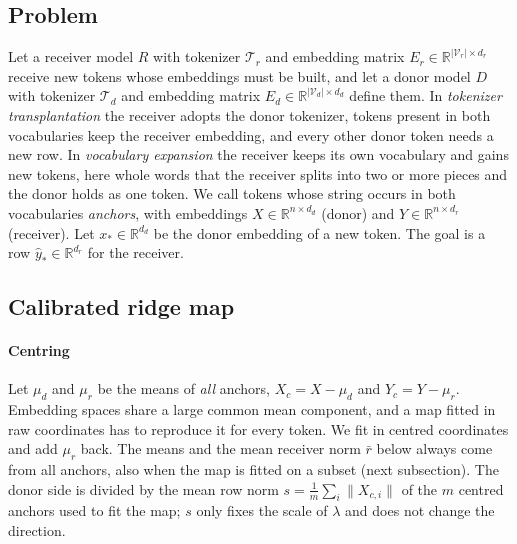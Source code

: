 \documentclass[preprint,12pt]{elsarticle}
\begin{document}
\subsection{Problem}
Let a receiver model $R$ with tokenizer $\mathcal T_r$ and embedding matrix $E_r\in\mathbb R^{|\mathcal V_r|\times d_r}$ receive new tokens whose embeddings must be built, and let a donor model $D$ with tokenizer $\mathcal T_d$ and embedding matrix $E_d\in\mathbb R^{|\mathcal V_d|\times d_d}$ define them. In \emph{tokenizer transplantation} the receiver adopts the donor tokenizer, tokens present in both vocabularies keep the receiver embedding, and every other donor token needs a new row. In \emph{vocabulary expansion} the receiver keeps its own vocabulary and gains new tokens, here whole words that the receiver splits into two or more pieces and the donor holds as one token. We call tokens whose string occurs in both vocabularies \emph{anchors}, with embeddings $X\in\mathbb R^{n\times d_d}$ (donor) and $Y\in\mathbb R^{n\times d_r}$ (receiver). Let $x_*\in\mathbb R^{d_d}$ be the donor embedding of a new token. The goal is a row $\hat y_*\in\mathbb R^{d_r}$ for the receiver.

\subsection{Calibrated ridge map}
\paragraph{Centring} Let $\mu_d$ and $\mu_r$ be the means of \emph{all} anchors, $X_c=X-\mu_d$ and $Y_c=Y-\mu_r$. Embedding spaces share a large common mean component, and a map fitted in raw coordinates has to reproduce it for every token. We fit in centred coordinates and add $\mu_r$ back. The means and the mean receiver norm $\bar r$ below always come from all anchors, also when the map is fitted on a subset (next subsection). The donor side is divided by the mean row norm $s=\frac1m\sum_i\|X_{c,i}\|$ of the $m$ centred anchors used to fit the map; $s$ only fixes the scale of $\lambda$ and does not change the direction.
\end{document}
